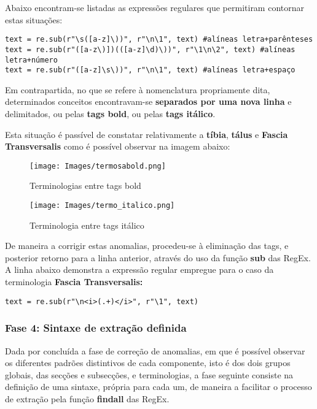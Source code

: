 Abaixo encontram-se listadas as expressões regulares que permitiram contornar estas situações:
\begin{lstlisting}[style=pythonstyle]
text = re.sub(r"\s([a-z]\))", r"\n\1", text) #alíneas letra+parênteses
text = re.sub(r"([a-z\)])(([a-z]\d)\))", r"\1\n\2", text) #alíneas letra+número
text = re.sub(r"([a-z]\s\))", r"\n\1", text) #alíneas letra+espaço
\end{lstlisting}

Em contrapartida, no que se refere à nomenclatura propriamente dita, determinados conceitos encontravam-se \textbf{separados por uma nova linha} e delimitados, ou pelas \textbf{tags bold}, ou pelas \textbf{tags itálico}.

Esta situação é passível de constatar relativamente a \textbf{tíbia}, \textbf{tálus} e \textbf{Fascia Transversalis} como é possível observar na imagem abaixo:

\begin{figure}[H]
    \centering
    \centering
    \texttt{[image: Images/termosabold.png]}
    \caption{Terminologias entre tags bold}
    \label{fig:termosbold}
\end{figure}

\begin{figure}[H]
    \centering
    \centering
    \texttt{[image: Images/termo\_italico.png]}
    \caption{Terminologia entre tags itálico}
    \label{fig:termositalico}
\end{figure}

De maneira a corrigir estas anomalias, procedeu-se à eliminação das tags, e posterior retorno para a linha anterior, através do uso da função \textbf{sub} das RegEx.\\
A linha abaixo demonstra a expressão regular empregue para o caso da terminologia \textbf{Fascia Transversalis:}
\begin{lstlisting}[style=pythonstyle]
text = re.sub(r"\n<i>(.+)</i>", r"\1", text)   
\end{lstlisting}


\subsubsection{Fase 4: Sintaxe de extração definida}

Dada por concluída a fase de correção de anomalias, em que é possível observar os diferentes padrões distintivos de cada componente, isto é dos dois grupos globais, das secções e subsecções, e terminologias, a fase seguinte consiste na definição de uma sintaxe, própria para cada um, de maneira a facilitar o processo de extração pela função \textbf{findall} das RegEx.

